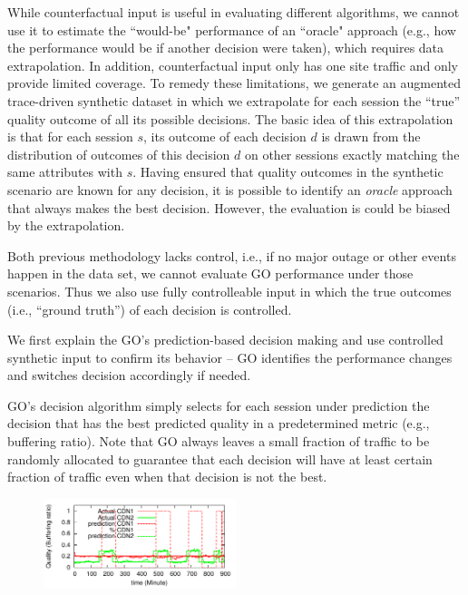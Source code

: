  While counterfactual input is useful in evaluating different algorithms, we cannot use it to estimate the ``would-be" performance of an ``oracle" approach (e.g., how the performance would be if another decision were taken), which requires data extrapolation. In addition, counterfactual input only has one site traffic and only provide limited coverage. To remedy these limitations, we generate an augmented trace-driven synthetic dataset in which we extrapolate for each session the ``true'' quality outcome of all its possible decisions. The basic idea of this extrapolation  is that for each session $s$, its outcome of each decision $d$ is drawn from the distribution of outcomes of this decision $d$ on other sessions exactly matching the same attributes with $s$. Having ensured that quality outcomes in the synthetic scenario are known for any decision, it is possible to identify an {\it oracle} approach that always makes the best decision. However, the evaluation is could be biased by the extrapolation.

 Both previous methodology lacks control, i.e., if no major outage or other events happen in the data set, we cannot evaluate GO performance under those scenarios. Thus we also use fully controlleable input in which the true outcomes (i.e., ``ground truth'') of each decision is controlled.


\label{subsec:behavior}

We first explain the GO's prediction-based decision making and use controlled synthetic input to confirm its behavior -- GO identifies the performance changes and switches decision accordingly if needed.

 GO's decision algorithm simply selects for each session under prediction the decision that has the best predicted quality in a predetermined metric (e.g., buffering ratio). Note that GO always leaves a small fraction of traffic to be randomly allocated to guarantee that each decision will have at least certain fraction of traffic even when that decision is not the best.


\begin{figure}[h!]
\centering
 \includegraphics[width=0.5\textwidth] {figures/behavior-evaluation/simple-change.pdf}
\label{fig:behavioral}
\end{figure}

